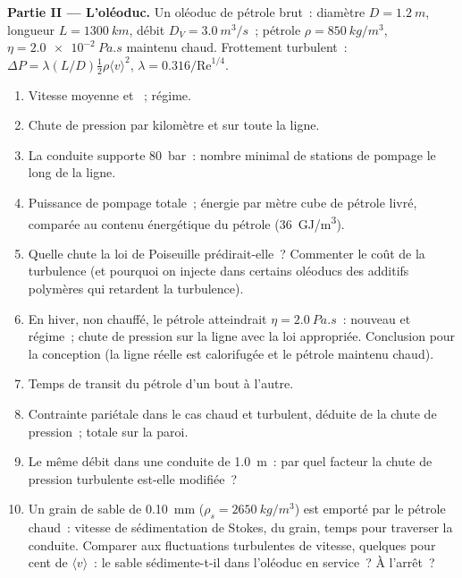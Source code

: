 \begin{problem}
\medskip
\noindent\textbf{Partie II --- L'oléoduc.}
Un oléoduc de pétrole brut~: diamètre $D = \qty{1.2}{m}$, longueur $L = \qty{1300}{km}$,
débit $D_V = \qty{3.0}{m^3/s}$~; pétrole $\rho = \qty{850}{kg/m^3}$, $\eta =
\qty{2.0e-2}{Pa.s}$ maintenu chaud. Frottement turbulent~: $\Delta P = \lambda
(L/D)\tfrac12\rho\langle v\rangle^2$, $\lambda = 0.316/\mathrm{Re}^{1/4}$.
\begin{enumerate}[resume]
  \item Vitesse moyenne et ~; régime.
  \item Chute de pression par kilomètre et sur toute la ligne.
  \item La conduite supporte \qty{80}{bar}~: nombre minimal de stations de pompage
        le long de la ligne.
  \item Puissance de pompage totale~; énergie par mètre cube de pétrole livré,
        comparée au contenu énergétique du pétrole (\qty{36}{GJ/m^3}).
  \item Quelle chute la loi de Poiseuille prédirait-elle~? Commenter le coût
        de la turbulence (et pourquoi on injecte dans certains oléoducs des
        additifs polymères qui retardent la turbulence).
  \item En hiver, non chauffé, le pétrole atteindrait $\eta = \qty{2.0}{Pa.s}$~:
        nouveau  et régime~; chute de pression sur la ligne
        avec la loi appropriée. Conclusion pour la conception (la ligne
        réelle est calorifugée et le pétrole maintenu chaud).
  \item Temps de transit du pétrole d'un bout à l'autre.
  \item Contrainte pariétale dans le cas chaud et turbulent, déduite de la
        chute de pression~;  totale sur la paroi.
  \item Le même débit dans une conduite de \qty{1.0}{m}~: par quel facteur la
        chute de pression turbulente est-elle modifiée~?
  \item Un grain de sable de \qty{0.10}{mm} ($\rho_s = \qty{2650}{kg/m^3}$) est emporté
        par le pétrole chaud~: vitesse de sédimentation de Stokes,  du
        grain, temps pour traverser la conduite. Comparer aux
        fluctuations turbulentes de vitesse, quelques pour cent de $\langle v
        \rangle$~: le sable sédimente-t-il dans l'oléoduc en service~? À
        l'arrêt~?
\end{enumerate}


\end{problem}
